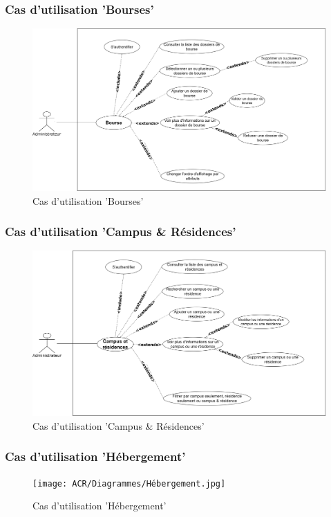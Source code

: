 
\subsubsection*{Cas d'utilisation 'Bourses'}
\begin{figure}[H]
    \centering
    \includegraphics[scale=0.1]{ACR/Diagrammes/Bourse.jpg}
    \caption{Cas d'utilisation 'Bourses'}
\end{figure}

\subsubsection*{Cas d'utilisation 'Campus \& Résidences'}
\begin{figure}[H]
    \centering
    \includegraphics[scale=0.1]{ACR/Diagrammes/Campus-Residences.jpg}
    \caption{Cas d'utilisation 'Campus \& Résidences'}
\end{figure}

\subsubsection*{Cas d'utilisation 'Hébergement'}
\begin{figure}[H]
    \centering
    \texttt{[image: ACR/Diagrammes/Hébergement.jpg]}
    \caption{Cas d'utilisation 'Hébergement'}
\end{figure}

